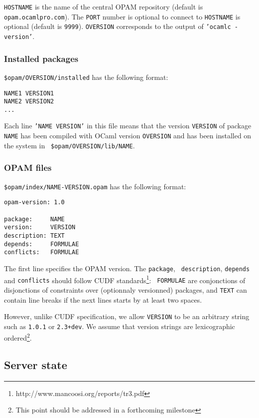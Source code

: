 \documentclass[a4paper,11pt]{article}
\begin{document}
{\tt HOSTNAME} is the name of the central OPAM repository (default is
{\tt opam.ocamlpro.com}). The {\tt PORT} number is optional to connect
to {\tt HOSTNAME} is optional (default is {\tt 9999}). {\tt OVERSION}
corresponds to the output of {\tt 'ocamlc -version'}.

\subsubsection{Installed packages}
\label{installed}

{\tt \$opam/OVERSION/installed} has the following format:

\begin{verbatim}
NAME1 VERSION1
NAME2 VERSION2
...
\end{verbatim}

Each line {\tt 'NAME VERSION'} in this file means that the version
{\tt VERSION} of package {\tt NAME} has been compiled with OCaml
version {\tt OVERSION} and has been installed on the system in {\tt
  \$opam/OVERSION/lib/NAME}.

\subsubsection{OPAM files}
\label{opam}

{\tt \$opam/index/NAME-VERSION.opam} has the following format:

\begin{verbatim}
opam-version: 1.0

package:     NAME
version:     VERSION
description: TEXT
depends:     FORMULAE
conflicts:   FORMULAE
\end{verbatim}

The first line specifies the OPAM version. The {\tt package}, {\tt
  description}, {\tt depends} and {\tt conflicts} should follow CUDF
standards\footnote{http://www.mancoosi.org/reports/tr3.pdf}: {\tt
  FORMULAE} are conjonctions of disjonctions of constraints over
(optionnaly versionned) packages, and {\tt TEXT} can contain line
breaks if the next lines starts by at least two spaces.

However, unlike CUDF specification, we allow {\tt VERSION} to be an
arbitrary string such as {\tt 1.0.1} or {\tt 2.3+dev}. We assume that
version strings are lexicographic ordered\footnote{This point should
  be addressed in a forthcoming milestone}.

\subsection{Server state}
\end{document}
